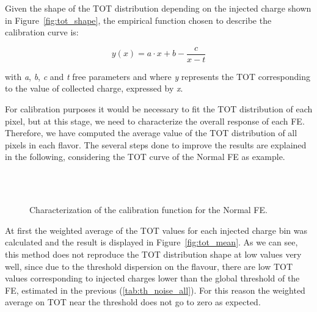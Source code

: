 Given the shape of the TOT distribution depending on the injected charge shown in Figure~\autoref{fig:tot_shape}, the empirical function chosen to describe the calibration curve is:

\begin{equation}
y(x) = a\cdot x +b -\frac{c}{x-t}
\label{eq:fit_function}
\end{equation}

with \textit{a}, \textit{b}, \textit{c} and \textit{t} free parameters and where \textit{y} represents the TOT corresponding to the value of collected charge, expressed by \textit{x}.

For calibration purposes it would be necessary to fit the TOT distribution of each pixel, but at this stage, we need to characterize the overall response of each FE. Therefore, we have computed the average value of the TOT distribution of all pixels in each flavor. The several steps done to improve the results are explained in the following, considering the TOT curve of the Normal FE as example.\\

\begin{figure}[h!]
\centering
{}\\
\quad
{}\\
\quad
{}
\caption{Characterization of the calibration function for the Normal FE.}
\end{figure}


At first the weighted average of the TOT values for each injected charge bin was calculated and the result is displayed in Figure~\autoref{fig:tot_mean}.
As we can see, this method does not reproduce the TOT distribution shape at low values very well, since due to the threshold dispersion on the flavour, there are low TOT values corresponding to injected charges lower than the global threshold of the FE, estimated in the previous (\autoref{tab:th_noise_all}). For this reason the weighted average on TOT near the threshold does not go to zero as expected. 

